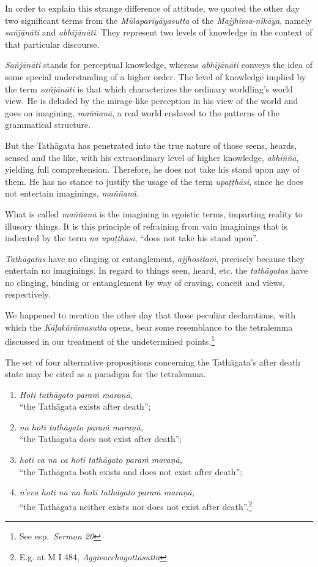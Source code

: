 In order to explain this strange difference of attitude, we quoted the other day two significant terms from the \emph{Mūlapariyāyasutta} of the \emph{Majjhima-nikāya}, namely \emph{sañjānāti} and \emph{abhijānāti}. They represent two levels of knowledge in the context of that particular discourse.

\emph{Sañjānāti} stands for perceptual knowledge, whereas \emph{abhijānāti} conveys the idea of some special understanding of a higher order. The level of knowledge implied by the term \emph{sañjānāti} is that which characterizes the ordinary worldling's world view. He is deluded by the mirage-like perception in his view of the world and goes on imagining, \emph{maññanā}, a real world enslaved to the patterns of the grammatical structure.

But the Tathāgata has penetrated into the true nature of those seens, heards, sensed and the like, with his extraordinary level of higher knowledge, \emph{abhiññā}, yielding full comprehension. Therefore, he does not take his stand upon any of them. He has no stance to justify the usage of the term \emph{upaṭṭhāsi}, since he does not entertain imaginings, \emph{maññanā}.

What is called \emph{maññanā} is the imagining in egoistic terms, imparting reality to illusory things. It is this principle of refraining from vain imaginings that is indicated by the term \emph{na upaṭṭhāsi}, ``does not take his stand upon''.

\emph{Tathāgatas} have no clinging or entanglement, \emph{ajjhositaṁ}, precisely because they entertain no imaginings. In regard to things seen, heard, etc. the \emph{tathāgatas} have no clinging, binding or entanglement by way of craving, conceit and views, respectively.

We happened to mention the other day that those peculiar declarations, with which the \emph{Kāḷakārāmasutta} opens, bear some resemblance to the tetralemma discussed in our treatment of the undetermined points.\footnote{See esp.~\emph{Sermon 20}}

The set of four alternative propositions concerning the Tathāgata's after death state may be cited as a paradigm for the tetralemma.

\begin{enumerate}
\def\labelenumi{\arabic{enumi}.}
\tightlist
\item
  \emph{Hoti tathāgato paraṁ maraṇā},\\
  ``the Tathāgata exists after death'';
\item
  \emph{na hoti tathāgato paraṁ maraṇā,}\\
  ``the Tathāgata does not exist after death'';
\item
  \emph{hoti ca na ca hoti tathāgato paraṁ maraṇā,}\\
  ``the Tathāgata both exists and does not exist after death'';
\item
  \emph{n'eva hoti na na hoti tathāgato paraṁ maraṇā,}\\
  ``the Tathāgata neither exists nor does not exist after death''.\footnote{E.g. at M I 484, \emph{Aggivacchagottasutta}}
\end{enumerate}

